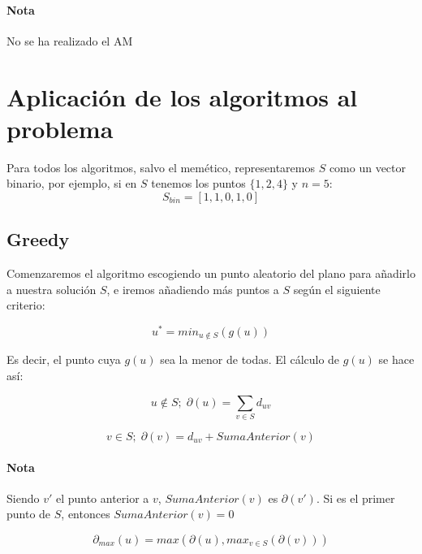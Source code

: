 \documentclass{article}
\begin{document}
    \paragraph*{Nota}No se ha realizado el AM

    \pagebreak
    \section{Aplicación de los algoritmos al problema}

    Para todos los algoritmos, salvo el memético, representaremos $S$ como un vector
    binario, por ejemplo, si en $S$ tenemos los puntos $\{1,2,4\}$ y $n = 5$:
    \begin{equation*}
        S_{bin} = [1,1,0,1,0]
    \end{equation*}

    \subsection{Greedy}

    Comenzaremos el algoritmo escogiendo un punto aleatorio del plano
    para añadirlo a nuestra solución $S$, e iremos añadiendo más puntos
    a $S$ según el siguiente criterio:

    \begin{equation*}
        u^* = min_{u \notin S}(g(u))
    \end{equation*}

    Es decir, el punto cuya $g(u)$ sea la menor de todas.
    El cálculo de $g(u)$ se hace así:

    \begin{equation*}
        u \notin S;\;\partial(u) = \sum_{v \in S}d_{uv}
    \end{equation*}

    \begin{equation*}
        v \in S;\;\partial(v) = d_{uv} + SumaAnterior(v)
    \end{equation*}

    \paragraph*{Nota}Siendo $v'$ el punto anterior a $v$, $SumaAnterior(v)$ es $\partial(v')$.
    Si es el primer punto de $S$, entonces $SumaAnterior(v) = 0$

    \begin{equation*}
        \partial_{max}(u) = max(\partial(u), max_{v \in S}(\partial(v)))
    \end{equation*}
\end{document}
